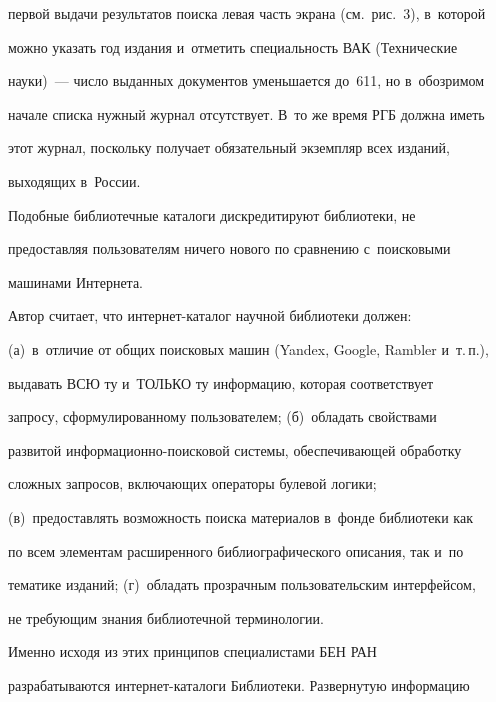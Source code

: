 первой выдачи результатов поиска левая часть экрана (см.\ рис.~3), в~которой 


можно указать год издания и~отметить специальность ВАК (Технические 


науки)~--- число выданных документов уменьшается до~611, но в~обозримом 


начале списка нужный журнал отсутствует. В~то же время РГБ должна иметь 


этот журнал, поскольку получает обязательный экземпляр всех изданий, 


выходящих в~Рос\-сии.


{





}





  


  Подобные библиотечные каталоги дискредитируют библиотеки, не 


предоставляя пользователям ничего нового по сравнению с~поисковыми 


машинами Интернета.


  


  Автор считает, что интернет-каталог научной библиотеки должен: 


(а)~в~отличие от общих поисковых машин (Yandex, Google, Rambler и~т.\,п.), 


выдавать ВСЮ ту и~ТОЛЬКО ту информацию, которая соответствует 


запросу, сформулированному пользователем; (б)~обладать свойствами 


развитой информационно-поисковой системы, обеспечивающей обработку 


сложных запросов, включающих операторы булевой логики; 


(в)~предоставлять возможность поиска материалов в~фонде библиотеки как 


по всем элементам расширенного библиографического описания, так и~по 


тематике изданий; (г)~обладать прозрачным пользовательским интерфейсом, 


не требующим знания библиотечной терминологии. 


  


  Именно исходя из этих принципов специалистами БЕН РАН 


разрабатываются интернет-каталоги Библиотеки. Развернутую информацию 


